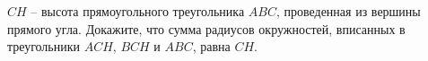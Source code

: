 \begin{ex}
	\begin{condition}
		\( CH \) – высота прямоугольного треугольника \( ABC \), проведенная из вершины прямого угла. Докажите, что сумма радиусов окружностей, вписанных в треугольники \( ACH \), \( BCH \) и \( ABC \), равна \( CH \).
	\end{condition}
\end{ex}